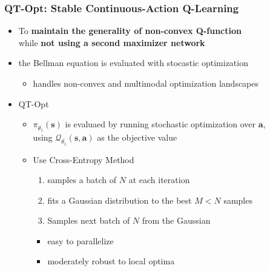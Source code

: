 \documentclass{beamer}
\renewcommand{\vec}[1]{\mathbf{#1}}
\newcommand{\forthSec}{QT-Opt}
\begin{document}
    \begin{frame}
      \frametitle{\forthSec : Stable Continuous-Action Q-Learning}
      \begin{itemize}
        \item To \textbf{maintain the generality of non-convex Q-function} \\ 
              while \textbf{not using a second maximizer network}
        \item the Bellman equation is evaluated with stocastic optimization
        \begin{itemize}
          \item handles non-convex and multimodal optimization landscapes
          \linebreak
        \end{itemize}
        \item QT-Opt
        \begin{itemize}
          \item $\pi_{\bar{\theta_1}}(\vec{s})$ is evaluaed by running stochastic optimization over $\vec{a}$, \\
                using $\mathcal{Q}_{\bar{\theta_1}}(\vec{s}, \vec{a})$ as the objective value
          \item Use Cross-Entropy Method
          \begin{enumerate}
            \item samples a batch of $N$ at each iteration
            \item fits a Gaussian distribution to the best $M < N$ samples
            \item Samples next batch of $N$ from the Gaussian
          \end{enumerate}          
          \begin{itemize}
            \item easy to parallelize
            \item moderately robust to local optima
          \end{itemize}
        \end{itemize}
      \end{itemize}
    \end{frame}
\end{document}
